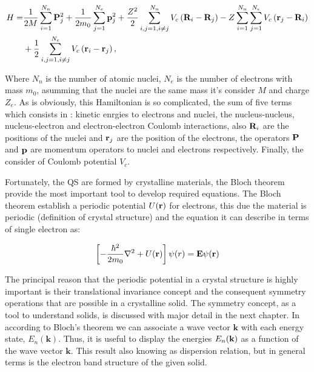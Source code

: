 \begin{equation}
\begin{split}
	H  =  &\dfrac{1}{2M}\sum\limits_{i=1}^{N_{n}} \mathrm{\bf P}_{j}^{2} + \dfrac{1}{2m_{0}} \sum\limits_{j=1}^{N_{e}} \mathrm{\bf p}_{j}^{2} + \dfrac{Z^{2}}{2} \sum\limits_{i,j=1,i\neq j}^{N_{n}} V_{c}\left(\mathrm{\bf R}_{i}-\mathrm{\bf R}_{j}\right)-Z\sum\limits_{i=1}^{N_{n}}\sum\limits_{j=1}^{N_{e}}V_{c}\left(\mathrm{\bf r}_{j}-\mathrm{\bf R}_{i}\right) \\
	   & + \dfrac{1}{2} \sum\limits_{i,j=1,i\neq j}^{N_{e}} V_{c} \left(\mathrm{\bf r}_{i}-\mathrm{\bf r}_{j}\right),
\end{split}
\label{eq:chapter-1-solid-hamiltonian}
\end{equation}

Where  $N_{n}$ is the number of atomic nuclei, $N_{e}$ is the number of electrons with mass $m_{0}$, asumming that the nuclei are the same mass it's consider  $M$ and charge $Z_{e}$. As is obviously, this Hamiltonian is so complicated, the sum of five terms which consists in : kinetic enrgies to electrons and nuclei, the nucleus-nucleus, nucleus-electron and electron-electron Coulomb interactions, also $\mathrm{\bf R}_{i}$ are the positions of the nuclei and $\mathrm{\bf r}_{j}$ are the position of the electrons, the operators $\mathrm{\bf P}$ and $\mathrm{\bf p}$ are momentum operators to nuclei and electrons respectively.  Finally, the consider of  Coulomb potential $V_{c}$\cite{alloul2010introduction}.  


Fortunately, the QS are formed by crystalline materials, the Bloch theorem provide the most important tool to develop required equations. The Bloch theorem establish a periodic potential $U(\displaystyle\mathrm{\bf r})$ for electrons, this due the material is periodic (definition of crystal structure) and the \sch equation it can describe in terms of single electron  as:  


\begin{equation}
	\left[-\dfrac{\hbar^2}{2m_{0}}\nabla^2 + U(\displaystyle\mathrm{\bf r})\right]\psi (r)=\displaystyle\mathrm{\bf E}\psi(\displaystyle\mathrm{\bf r})
	\label{eq:chapter-1-first-sch}
\end{equation}

The principal reason that the periodic potential in a crystal structure is highly important is their translational invariance concept and the consequent symmetry operations that are possible in a crystalline solid. The symmetry concept, as a  tool to understand solids, is discussed with major detail in the next chapter. In according to Bloch's theorem we can associate a wave vector $\boldsymbol{k}$ with each energy state, $E_{n}(\boldsymbol{k})$. Thus, it is useful to display the energies $E_{n}(\bf{k})$ as a function of the wave vector $\boldsymbol{k}$. This result also knowing as dispersion relation, but in general terms is the electron band structure of the given solid\cite{piprek2017handbook}.   

